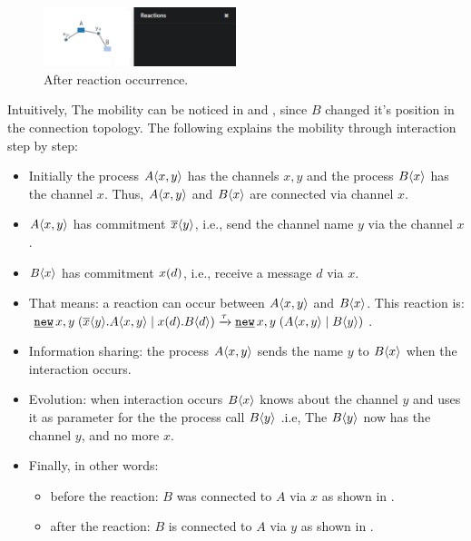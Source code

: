 \begin{figure}[ht!]
	\centering
	\includegraphics[width=0.5\textwidth]{./images/pi_mobility_stargazer_After_react.png}
	\caption{After reaction occurrence.}
	\label{pi_mobility_stargazer_After_react}
\end{figure}
Intuitively, The mobility can be noticed in  and , since $B$ changed it's position in the connection topology.
The following explains the mobility through interaction step by step:
\begin{itemize}
\item Initially the process $A\langle x,y\rangle$ has the channels $x,y$ and the process $B\langle x\rangle$ has the channel $x$. Thus, $A\langle x,y\rangle$ and $B\langle x\rangle$ are connected via channel $x$.
\item $A\langle x,y\rangle$ has commitment $\overline{x}\langle{y}\rangle$, i.e., send the channel name $y$ via the channel $x$.
\item $B\langle x\rangle$ has commitment $x({d})$, i.e., receive a message $d$ via $x$.
\item That means: a reaction can occur between $A\langle x,y\rangle$ and $B\langle x\rangle$. This reaction is: $\procres{x,y}{(\procpar{\out{x}{{y}}.\proccall{A}{x,y}}{\inp{x}{{d}}.\proccall{B}{d}})} \transs{\tau} \procres{x,y}{(\procpar{\proccall{A}{x,y}}{\proccall{B}{y}})}$.
\item Information sharing: the process $A\langle x,y\rangle$ sends the name $y$ to $B\langle x\rangle$ when the interaction occurs.
\item Evolution: when interaction occurs $B\langle x\rangle$ knows about the channel $y$ and uses it as parameter for the the process call $B\langle y\rangle$ .i.e, The  $B\langle y\rangle$ now has the channel $y$, and no more $x$.
\item Finally, in other words: 
\begin{itemize}
\item before the reaction: $B$ was connected to $A$ via $x$ as shown in .
\item after the reaction: $B$ is connected to $A$ via $y$ as shown in .
\end{itemize}
\end{itemize}
